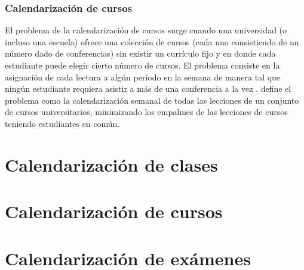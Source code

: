 \documentclass[draft,12pt,headsepline,footsepline,paper=letter]{scrreprt}
\begin{document}
\subsubsection{Calendarización de cursos}

El problema de la calendarización de cursos surge cuando una universidad (o incluso una escuela) ofrece una colección de cursos (cada uno consistiendo de un número dado de conferencias) sin existir un currículo fijo y en donde cada estudiante puede elegir cierto número de cursos. El problema consiste en la asignación de cada lectura a algún periodo en la semana de manera tal que ningún estudiante requiera asistir a más de una conferencia a la vez \citep[p.~157]{werra85an-introduction-to-timetabling}.
\citet[p.~88]{schaerf99a-survey-of-automated} define el problema como la calendarización semanal de todas las lecciones de un conjunto de cursos universitarios, minimizando los empalmes de las lecciones de cursos teniendo estudiantes en común.

\section{Calendarización de clases}
\label{sec:calendarizacion_clases}

\section{Calendarización de cursos}
\label{sec:calendarizacion_cursos}

\section{Calendarización de exámenes}
\label{sec:calendarizacion_examenes}
\end{document}

